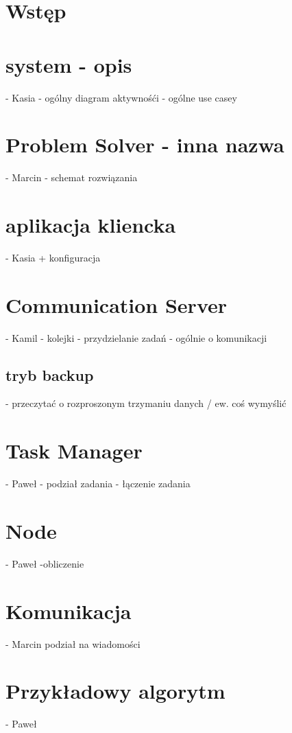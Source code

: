 \documentclass{book}
\begin{document}
\tableofcontents


	\chapter{Wstęp}
	\chapter{system - opis} - Kasia
		- ogólny diagram aktywnośći 
		- ogólne use casey
	\chapter{Problem Solver - inna nazwa} - Marcin
		- schemat rozwiązania
	\chapter{aplikacja kliencka} - Kasia
		+ konfiguracja	
	\chapter{Communication Server} - Kamil
		- kolejki
		- przydzielanie zadań
		- ogólnie o komunikacji
		\section{tryb backup}
			- przeczytać o rozproszonym trzymaniu danych / ew. coś wymyślić
	\chapter{Task Manager} - Paweł
		- podział zadania 
		- łączenie zadania
	\chapter{Node} - Paweł
		-obliczenie
		
	\chapter{Komunikacja} - Marcin
		podział na wiadomości
	\chapter{Przykładowy algorytm} - Paweł
\end{document}
